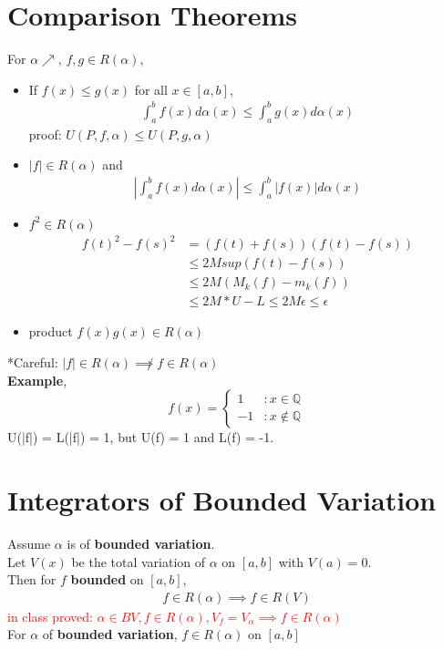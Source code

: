 \documentclass[12pt]{article}
\newcommand{\abs}[1]{\left\vert#1\right\vert} %
\newcommand{\bt}[1]{\textbf{#1}} %
\newcommand{\eq}[1]{\begin{align*}#1\end{align*}} %
\newcommand{\gray}[1]{\textcolor[gray]{0.5}{#1}} %
\begin{document}
{\section*{Comparison Theorems}
For $\alpha \nearrow$, $f, g \in R(\alpha)$,
\begin{itemize}
    \item If $f(x) \leq g(x)$ for all $x \in [a, b]$,
    \eq{\int_a^b f(x) d\alpha(x) \leq \int_a^b g(x) d \alpha(x)}
    \gray{proof: $U(P, f, \alpha) \leq U(P, g, \alpha)$}

    \item $|f| \in R(\alpha)$ and 
    \eq{\abs{\int_a^b f(x) d \alpha(x)} \leq \int_a^b |f(x)| d \alpha(x)}

    \item $f^2 \in R(\alpha)$\\
    \gray{\eq{f(t)^2 - f(s)^2 &= (f(t) + f(s))(f(t) - f(s))\\
    & \leq 2 M sup(f(t) - f(s)) \tag{M is bound of f}\\
    & \leq 2M (M_k(f) - m_k(f)) \\
    & \leq 2M * U - L \leq 2M \epsilon \leq \epsilon \tag{with adjustment}
    }}
    \item product $f(x)g(x) \in R(\alpha)$
\end{itemize}

*Careful: $|f| \in R(\alpha) \not \implies f \in R(\alpha)$\\
\bt{Example}, 
 \begin{displaymath}
   f(x) = \left\{
     \begin{array}{lr}
       1 & : x \in \mathbb{Q}\\
       -1 & : x \notin \mathbb{Q}
     \end{array}
   \right.
\end{displaymath} 
U(|f|) = L(|f|) = 1, but U(f) = 1 and L(f) = -1.

\section{Integrators of Bounded Variation}
Assume $\alpha$ is of \bt{bounded variation}.\\
Let $V(x)$ be the total variation of $\alpha$ on $[a, b]$ with $V(a) = 0$.\\
Then for $f$ \bt{bounded} on $[a, b]$, 
\eq{f \in R(\alpha) \implies f \in R(V)}
\textcolor{red}{in class proved: $\alpha \in BV, f \in R(\alpha), V_f = V_\alpha \implies f \in R(\alpha)$}
\ \\
\noindent For $\alpha$ of \bt{bounded variation}, $f \in R(\alpha)$ on $[a, b]$\\

}
\end{document}
